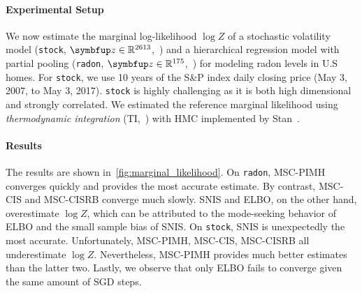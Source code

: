 \paragraph{Experimental Setup}
We now estimate the marginal log-likelihood \(\log Z\) of a stochastic volatility model (\texttt{stock}, \(\vz \in \mathbb{R}^{2613}\),~\citealt{kim_stochastic_1998}) and a hierarchical regression model with partial pooling (\texttt{radon}, \(\vz \in \mathbb{R}^{175}\),~\citealt{gelman_data_2007}) for modeling radon levels in U.S homes.
For \texttt{stock}, we use 10 years of the S\&P index daily closing price (May 3, 2007, to May 3, 2017).
\texttt{stock} is highly challenging as it is both high dimensional and strongly correlated.
We estimated the reference marginal likelihood using \textit{thermodynamic integration} (TI,~\citealt{gelman_simulating_1998, neal_annealed_2001, lartillot_computing_2006}) with HMC implemented by Stan~\citep{carpenter_stan_2017, betancourt_conceptual_2017}.

\vspace{-0.10in}
\paragraph{Results}
The results are shown in~\cref{fig:marginal_likelihood}.
On \texttt{radon}, MSC-PIMH converges quickly and provides the most accurate estimate.
By contrast, MSC-CIS and MSC-CISRB converge much slowly.
SNIS and ELBO, on the other hand, overestimate \(\log Z\), which can be attributed to the mode-seeking behavior of ELBO and the small sample bias of SNIS.
On \texttt{stock}, SNIS is unexpectedly the most accurate.
Unfortunately, MSC-PIMH, MSC-CIS, MSC-CISRB all underestimate \(\log Z\).
Nevertheless, MSC-PIMH provides much better estimates than the latter two.
Lastly, we observe that only ELBO fails to converge given the same amount of SGD steps.

